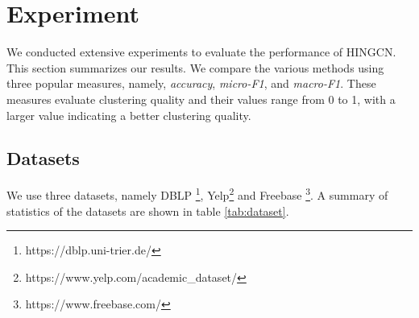 \section{Experiment}
\label{sec:exp}
We conducted extensive experiments to evaluate the performance of HINGCN.
This section summarizes our results. 
We compare the various methods using three popular measures, 
namely, \emph{accuracy}, \emph{micro-F1}, and \emph{macro-F1}.
These measures evaluate clustering quality and their values range from 0 to 1, 
with a larger value indicating a better
clustering quality. 

\subsection{Datasets}
We use three datasets, namely DBLP \footnote{https://dblp.uni-trier.de/}, Yelp\footnote{https://www.yelp.com/academic{\_}dataset/} and Freebase \footnote{https://www.freebase.com/}. A summary of statistics of the datasets are shown in table \ref{tab:dataset}.

